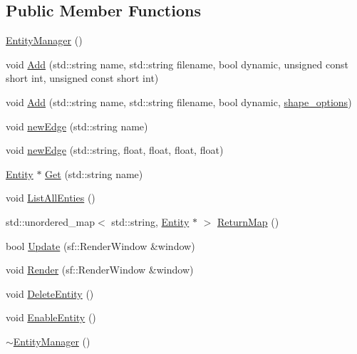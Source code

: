 \subsection*{Public Member Functions}
\begin{DoxyCompactItemize}
\item 
\hyperlink{classSekander_1_1EntityManager_a98a085b51de53396a9a9b7803422c6ff}{Entity\+Manager} ()
\item 
void \hyperlink{classSekander_1_1EntityManager_afaae67bb65ba3dac38417caf4e2c2f2b}{Add} (std\+::string name, std\+::string filename, bool dynamic, unsigned const short int, unsigned const short int)
\item 
void \hyperlink{classSekander_1_1EntityManager_a4b0fdd5fb634533e04fe33c48a25f6e9}{Add} (std\+::string name, std\+::string filename, bool dynamic, \hyperlink{namespaceSekander_aed8eb219f4685b29738464e9f32c5d94}{shape\+\_\+options})
\item 
void \hyperlink{classSekander_1_1EntityManager_ab5c80c9646fea25cb0ab110a4ac51d38}{new\+Edge} (std\+::string name)
\item 
void \hyperlink{classSekander_1_1EntityManager_a0debb38e1fb1e88d3d4e5af522e80b90}{new\+Edge} (std\+::string, float, float, float, float)
\item 
\hyperlink{classSekander_1_1Entity}{Entity} $\ast$ \hyperlink{classSekander_1_1EntityManager_a9c4fa2dc9649cdd63ba64bea469c267c}{Get} (std\+::string name)
\item 
void \hyperlink{classSekander_1_1EntityManager_a10a4ff59b03ab00e9688063de4bc9c98}{List\+All\+Enties} ()
\item 
std\+::unordered\+\_\+map$<$ std\+::string, \hyperlink{classSekander_1_1Entity}{Entity} $\ast$ $>$ \hyperlink{classSekander_1_1EntityManager_aff93fbae10b873e3bd402ad1acc23b32}{Return\+Map} ()
\item 
bool \hyperlink{classSekander_1_1EntityManager_ac2385e541fe3ac866f90daad53892a00}{Update} (sf\+::\+Render\+Window \&window)
\item 
void \hyperlink{classSekander_1_1EntityManager_a24bc2a30b608d425aaeded98c1c18cfc}{Render} (sf\+::\+Render\+Window \&window)
\item 
void \hyperlink{classSekander_1_1EntityManager_a71d1b6d1c1a80efa0117e3bf8e982562}{Delete\+Entity} ()
\item 
void \hyperlink{classSekander_1_1EntityManager_a5ce5af4eb68c0dd7d019877f65ea4c83}{Enable\+Entity} ()
\item 
\hyperlink{classSekander_1_1EntityManager_adcd3f85835de9ac2eb2af3c876899244}{$\sim$\+Entity\+Manager} ()
\end{DoxyCompactItemize}
